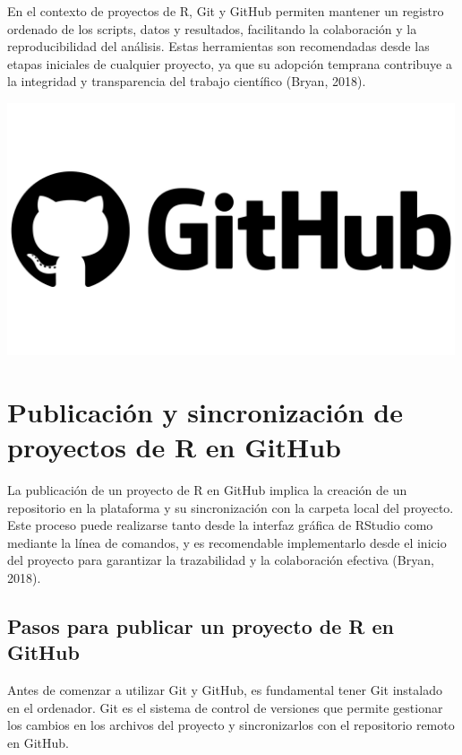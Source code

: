 \documentclass[
  spanish,
  a4paper,
  DIV=11,
  numbers=noendperiod,
  onepage,
  openany]{scrreprt}
\begin{document}
En el contexto de proyectos de R, Git y GitHub permiten mantener un
registro ordenado de los scripts, datos y resultados, facilitando la
colaboración y la reproducibilidad del análisis. Estas herramientas son
recomendadas desde las etapas iniciales de cualquier proyecto, ya que su
adopción temprana contribuye a la integridad y transparencia del trabajo
científico (Bryan, 2018).

\begin{center}
\includegraphics[width=5.20833in,height=\textheight,keepaspectratio]{GitHub-Emblem.png}
\end{center}

\section{Publicación y sincronización de proyectos de R en
GitHub}\label{publicaciuxf3n-y-sincronizaciuxf3n-de-proyectos-de-r-en-github}

La publicación de un proyecto de R en GitHub implica la creación de un
repositorio en la plataforma y su sincronización con la carpeta local
del proyecto. Este proceso puede realizarse tanto desde la interfaz
gráfica de RStudio como mediante la línea de comandos, y es recomendable
implementarlo desde el inicio del proyecto para garantizar la
trazabilidad y la colaboración efectiva (Bryan, 2018).

\subsection{Pasos para publicar un proyecto de R en
GitHub}\label{pasos-para-publicar-un-proyecto-de-r-en-github}

Antes de comenzar a utilizar Git y GitHub, es fundamental tener Git
instalado en el ordenador. Git es el sistema de control de versiones que
permite gestionar los cambios en los archivos del proyecto y
sincronizarlos con el repositorio remoto en GitHub.
\end{document}
